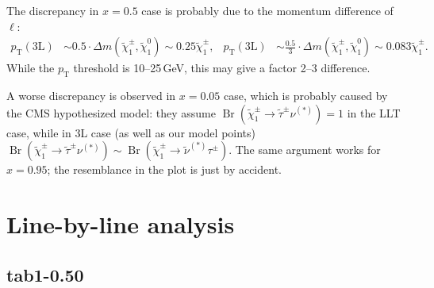 \documentclass[a4paper,10pt,captions=tableheading,DIV=14]{scrartcl}
\numberwithin{equation}{section}
\newcommand\w[1]{_{\mathrm{#1}}}
\DeclareMathOperator{\Br}{\mathrm{Br}}
\newcommand\neut  [1][\relax]{{\tilde\chi^0_{#1}}}
\newcommand\charPM[1][\relax]{{\tilde\chi^\pm_{#1}}}
\begin{document}
The discrepancy in $x=0.5$ case is probably due to the momentum difference of $\ell$:
\begin{align}
 p\w T(\text{3L}) &\sim 0.5\cdot\Delta m(\charPM[1],\neut[1])\sim 0.25\charPM[1],
&
 p\w T(\text{3L}) &\sim \frac{0.5}{3}\cdot\Delta m(\charPM[1],\neut[1])\sim 0.083\charPM[1].
\end{align}
While the $p\w T$ threshold is 10--25\,GeV, this may give a factor 2--3 difference.

A worse discrepancy is observed in $x=0.05$ case, which is probably caused by the CMS hypothesized model: they assume $\Br(\charPM[1]\to\tilde\tau^\pm\nu^{(*)})=1$ in the LLT case, while in 3L case (as well as our model points) $\Br(\charPM[1]\to\tilde\tau^\pm\nu^{(*)})\sim\Br(\charPM[1]\to\tilde\nu^{(*)}\tau^\pm)$.
The same argument works for $x=0.95$; the resemblance in the plot is just by accident.

\clearpage

\section{Line-by-line analysis}
\subsection{tab1-0.50}
\end{document}
